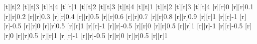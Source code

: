 \begin{psfrags}
[t][t]{2}%
[t][t]{3}%
[t][t]{4}%
[t][t]{1}%
[t][t]{2}%
[t][t]{3}%
[t][t]{4}%
[t][t]{1}%
[t][t]{2}%
[t][t]{3}%
[t][t]{4}%
%
[r][r]{0}%
[r][r]{0.1}%
[r][r]{0.2}%
[r][r]{0.3}%
[r][r]{0.4}%
[r][r]{0.5}%
[r][r]{0.6}%
[r][r]{0.7}%
[r][r]{0.8}%
[r][r]{0.9}%
[r][r]{1}%
[r][r]{-1}%
[r][r]{-0.5}%
[r][r]{0}%
[r][r]{0.5}%
[r][r]{1}%
[r][r]{-1}%
[r][r]{-0.5}%
[r][r]{0}%
[r][r]{0.5}%
[r][r]{1}%
[r][r]{-1}%
[r][r]{-0.5}%
[r][r]{0}%
[r][r]{0.5}%
[r][r]{1}%
[r][r]{-1}%
[r][r]{-0.5}%
[r][r]{0}%
[r][r]{0.5}%
[r][r]{1}%
%
%
\end{psfrags}%
%

